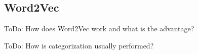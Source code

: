 \subsection{Word2Vec} %
\label{sub:word_2_vec}

\colorbox{yellow!30}{ToDo:} How does Word2Vec work and what is the advantage?

\colorbox{yellow!30}{ToDo:} How is categorization usually performed?
